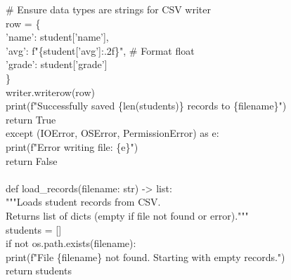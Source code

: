 \documentclass[11pt]{article}
\begin{document}
\begin{exoresolu}
\begin{flushleft}
\hspace{4em}\# Ensure data types are strings for CSV writer\\
\hspace{4em}row = \{\\
\hspace{5em}'name': student['name'],\\
\hspace{5em}'avg': f"\{student['avg']:.2f\}", \hspace{1em}\# Format float\\
\hspace{5em}'grade': student['grade']\\
\hspace{4em}\}\\
\hspace{4em}writer.writerow(row)\\
\hspace{2em}print(f"Successfully saved \{len(students)\} records to \{filename\}")\\
\hspace{2em}return True\\
\hspace{1em}except (IOError, OSError, PermissionError) as e:\\
\hspace{2em}print(f"Error writing file: \{e\}")\\
\hspace{2em}return False\\
\mbox{}\\
def load\_records(filename: str) -> list:\\
\hspace{1em}"""\hspace{0.5em}Loads student records from CSV.\\
\hspace{1em}Returns list of dicts (empty if file not found or error).\hspace{0.5em}"""\\
\hspace{1em}students = []\\
\hspace{1em}if not os.path.exists(filename):\\
\hspace{2em}print(f"File \{filename\} not found. Starting with empty records.")\\
\hspace{2em}return students\\
\mbox{}\\

\end{flushleft}
\end{exoresolu}
\end{document}
